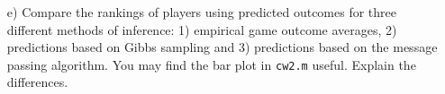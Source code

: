 \documentclass[11pt]{article}
\begin{document}
\begin{enumerate}
\item[e)] Compare the rankings of players using predicted outcomes for three different
  methods of inference: 1) empirical game outcome averages, 2) predictions based on
  Gibbs sampling and 3) predictions based on the message passing
  algorithm.  You may find the bar  plot in \texttt{cw2.m}
  useful. Explain the differences.

\end{enumerate}
\end{document}
